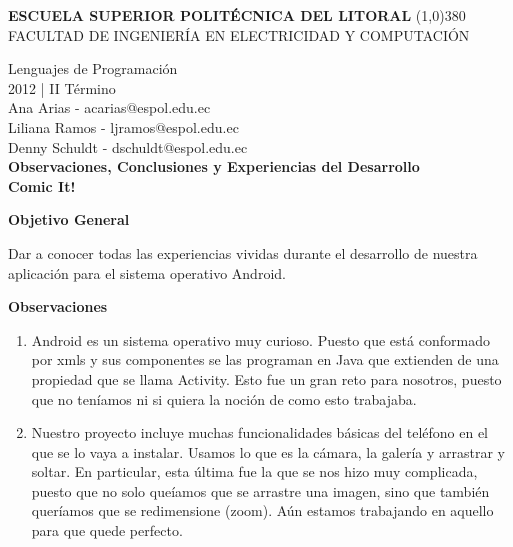 \documentclass[12pt]{report}
\begin{document}
	\setlength{\topmargin}{-0.5in}
	\pagestyle{empty}
	\begin{center}
		\textbf{
			\vspace{-0.7em}
			ESCUELA SUPERIOR POLITÉCNICA DEL LITORAL
		}
		\line(1,0){380}\\		
		\scriptsize{FACULTAD DE INGENIERÍA EN ELECTRICIDAD Y COMPUTACIÓN}
	\end{center}
	\begin{center}
		\vspace{2.5em}
		Lenguajes de Programación
		\\2012 | II Término
		\vspace{1.5em}
		\\Ana Arias - acarias@espol.edu.ec
		\vspace{0.6mm}
		\\Liliana Ramos - ljramos@espol.edu.ec
		\\Denny Schuldt - dschuldt@espol.edu.ec
		\vspace{3em}
		\large{\textbf{\\ Observaciones, Conclusiones y Experiencias del Desarrollo	\vspace{2em}}}		
	\Huge{\textbf{\\ Comic It!	\vspace{1em}}}
\end{center}
		
\begingroup
		\large{
			\textbf{
				Objetivo General
				\newline
				\newline
			}
		}
	\endgroup

	Dar a conocer todas las experiencias vividas durante el desarrollo de nuestra aplicación para el sistema operativo Android.

	\vspace{4em}

\begingroup
		\large{
			\textbf{
				Observaciones
				\newline
				\newline
			}
		}
	\endgroup

		\begin{enumerate}[a]%
		\item Android es un sistema operativo muy curioso. Puesto que está conformado por xmls y sus componentes se las programan en Java que extienden de una propiedad que se llama Activity.
Esto fue un gran reto para nosotros, puesto que no teníamos ni si quiera la noción de como esto trabajaba.
		\item Nuestro proyecto incluye muchas funcionalidades básicas del teléfono en el que se lo vaya a instalar. Usamos lo que es la cámara, la galería y arrastrar y soltar. En particular, esta última fue la que se nos hizo muy complicada, puesto que no solo queíamos que se arrastre una imagen, sino que también queríamos que se redimensione (zoom). Aún estamos trabajando en aquello para que quede perfecto.
		\end{enumerate}
	


	
\end{document}
